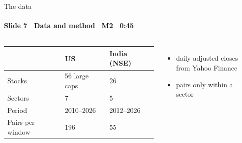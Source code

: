 \begin{frame}{The data}
\framesubtitle{Slide 7 \textbullet\ Data and method \textbullet\ M2 \textbullet\ 0:45}
\vspace{-2pt}
\begin{columns}[T,onlytextwidth]
  \footnotesize\setlength{\tabcolsep}{5pt}
  \begin{tabular}{@{}lll@{}}
    \toprule
    & US & India (NSE) \\
    \midrule
    Stocks   & 56 large caps & 26 \\
    Sectors  & 7 & 5 \\
    Period   & 2010--2026 & 2012--2026 \\
    Pairs per window & 196 & 55 \\
    \bottomrule
  \end{tabular}
  \normalsize\raggedright
  \begin{itemize}\setlength{\itemsep}{2pt}
    \item daily adjusted closes from Yahoo Finance
    \item pairs only within a sector
  \end{itemize}
\end{columns}
\end{frame}
